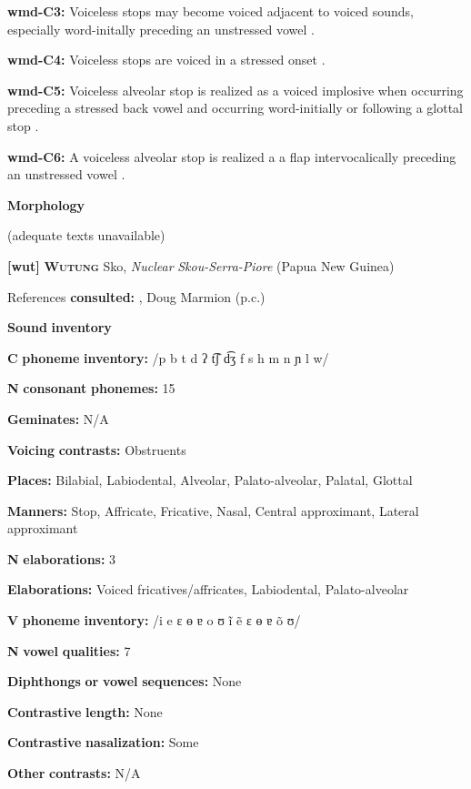 \begin{styleBody}
\textbf{wmd-C3:} Voiceless stops may become voiced adjacent to voiced sounds, especially word-initally preceding an unstressed vowel \citep{Eberhard2009}.

\textbf{wmd-C4:} Voiceless stops are voiced in a stressed onset \citep[55]{Eberhard2009}.

\textbf{wmd-C5:} Voiceless alveolar stop is realized as a voiced implosive when occurring preceding a stressed back vowel and occurring word-initially or following a glottal stop \citep[58]{Eberhard2009}.

\textbf{wmd-C6:} A voiceless alveolar stop is realized a a flap intervocalically preceding an unstressed vowel \citep[55]{Eberhard2009}.

\textbf{Morphology}

(adequate texts unavailable)

\textbf{[wut]}   \textbf{\textsc{Wutung}}  Sko, \textit{Nuclear} \textit{Skou-Serra-Piore} (Papua New Guinea)

References \textbf{consulted:} \citet{Marmion2010}, Doug Marmion (p.c.)

\textbf{Sound} \textbf{inventory}

\textbf{C} \textbf{phoneme} \textbf{inventory:} /p b t d ʔ t͡ʃ d͡ʒ f s h m n ɲ l w/

\textbf{N} \textbf{consonant} \textbf{phonemes:} 15

\textbf{Geminates:} N/A

\textbf{Voicing} \textbf{contrasts:} Obstruents

\textbf{Places:} Bilabial, Labiodental, Alveolar, Palato-alveolar, Palatal, Glottal

\textbf{Manners:} Stop, Affricate, Fricative, Nasal, Central approximant, Lateral approximant

\textbf{N} \textbf{elaborations:} 3

\textbf{Elaborations:} Voiced fricatives/affricates, Labiodental, Palato-alveolar

\textbf{V} \textbf{phoneme} \textbf{inventory:} /i e ɛ ɵ ɐ o ʊ ĩ ẽ ɛ ɵ ɐ õ ʊ/

\textbf{N} \textbf{vowel} \textbf{qualities:} 7

\textbf{Diphthongs} \textbf{or} \textbf{vowel} \textbf{sequences:} None

\textbf{Contrastive} \textbf{length:} None

\textbf{Contrastive} \textbf{nasalization:} Some

\textbf{Other} \textbf{contrasts:} N/A


\end{styleBody}
